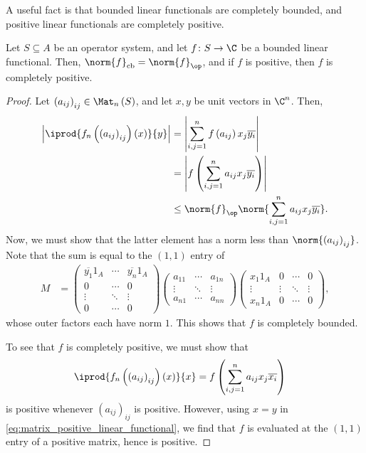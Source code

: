 A useful fact is that bounded linear functionals are completely bounded, and positive linear functionals are completely positive.
\begin{proposition}
  Let $S\subseteq A$ be an operator system, and let $f\colon S\rightarrow \C$ be a bounded linear functional. Then, $\norm{f}_{\cb} = \norm{f}_{\op}$, and if $f$ is positive, then $f$ is completely positive.
\end{proposition}
\begin{proof}
  Let $\left( a_{ij} \right)_{ij}\in \Mat_n\left( S \right)$, and let $x,y$ be unit vectors in $\C^n$. Then,
  \begin{align*}
    \left\vert \iprod{f_n\left( \left( a_{ij} \right)_{ij} \right)\left( x \right)}{y} \right\vert &= \left\vert \sum_{i,j=1}^{n}f\left( a_{ij} \right)x_j\overline{y_i} \right\vert\\
                                                                                                   &= \left\vert f\left( \sum_{i,j=1}^{n} a_{ij}x_j \overline{y_i} \right) \right\vert\\
                                                                                                   &\leq \norm{f}_{\op}\norm{\sum_{i,j=1}^{n}a_{ij}x_j\overline{y_i}}.
  \end{align*}
  Now, we must show that the latter element has a norm less than $\norm{\left( a_{ij} \right)_{ij}}$. Note that the sum is equal to the $(1,1)$ entry of
  \begin{align*}
    M &= \begin{pmatrix}\overline{y_1}1_A & \cdots & \overline{y_n}1_A \\ 0 & \cdots & 0 \\ \vdots & \ddots & \vdots \\ 0 & \cdots & 0\end{pmatrix} \begin{pmatrix}a_{11} & \cdots & a_{1n} \\ \vdots & \ddots & \vdots \\ a_{n1} & \cdots & a_{nn}\end{pmatrix} \begin{pmatrix}x_1 1_A & 0 & \cdots & 0 \\ \vdots & \vdots & \ddots & \vdots \\ x_n1_A  & 0 & \cdots & 0\end{pmatrix},\label{eq:matrix_positive_linear_functional}\tag{\textasteriskcentered}
  \end{align*}
  whose outer factors each have norm $1$. This shows that $f$ is completely bounded.\newline

  To see that $f$ is completely positive, we must show that
  \begin{align*}
    \iprod{f_n\left( \left( a_{ij} \right)_{ij} \right)\left( x \right)}{x} &= f\left( \sum_{i,j=1}^{n}a_{ij}x_j\overline{x_i} \right)
  \end{align*}
  is positive whenever $\left( a_{ij} \right)_{ij}$ is positive. However, using $x = y$ in \eqref{eq:matrix_positive_linear_functional}, we find that $f$ is evaluated at the $(1,1)$ entry of a positive matrix, hence is positive.
\end{proof}
